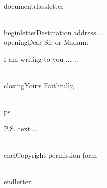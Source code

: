 \\documentclass{letter}\n
\begin{document}
\n\n

\\begin{letter}{Destination address....}\n
\\opening{Dear Sir or Madam:}\n\n

I am writing to you .......\n\n\n


\\closing{Yours Faithfully,}\n

\\ps\n\n

P.S. text .....\n\n

\\encl{Copyright permission form}\n\n

\\end{letter}\n
\
\end{document}

